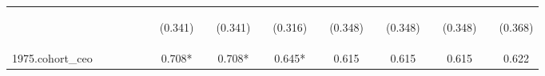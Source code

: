 \begin{center}
\begin{tabular}{lcccccccccccccccccc}
\vspace{4pt} & \begin{footnotesize}\end{footnotesize} & \begin{footnotesize}\end{footnotesize} & \begin{footnotesize}\end{footnotesize} & \begin{footnotesize}\end{footnotesize} & \begin{footnotesize}\end{footnotesize} & \begin{footnotesize}(0.341)\end{footnotesize} & \begin{footnotesize}\end{footnotesize} & \begin{footnotesize}(0.341)\end{footnotesize} & \begin{footnotesize}\end{footnotesize} & \begin{footnotesize}(0.316)\end{footnotesize} & \begin{footnotesize}\end{footnotesize} & \begin{footnotesize}(0.348)\end{footnotesize} & \begin{footnotesize}\end{footnotesize} & \begin{footnotesize}(0.348)\end{footnotesize} & \begin{footnotesize}\end{footnotesize} & \begin{footnotesize}(0.348)\end{footnotesize} & \begin{footnotesize}\end{footnotesize} & \begin{footnotesize}(0.368)\end{footnotesize} \\
1975.cohort\_ceo &  &  &  &  &  & 0.708* &  & 0.708* &  & 0.645* &  & 0.615 &  & 0.615 &  & 0.615 &  & 0.622 \\

\end{tabular}
\end{center}
